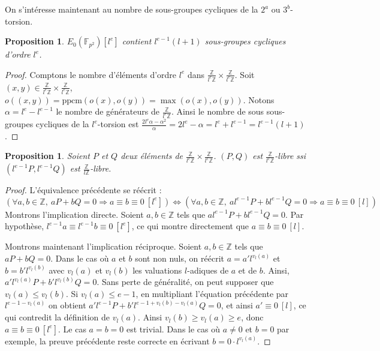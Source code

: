 \documentclass{article}
\theoremstyle{plain}%
\newtheorem{prop}[thm]{Proposition}
\theoremstyle{definition}%
\newcommand{\Fq}{\mathbb{F}_{p^2}}
\newcommand{\Z}{\mathbb{Z}}
\begin{document}
On s'intéresse maintenant au nombre de sous-groupes cycliques de la $2^a$ ou $3^b$-torsion.

\begin{prop}
  $E_0(\Fq)[l^e]$ contient $l^{e-1}(l+1)$ sous-groupes cycliques d'ordre $l^e$.
\end{prop}
\begin{proof}
  Comptons le nombre d'éléments d'ordre $l^e$ dans $\frac{\Z}{l^e\Z} \times \frac{\Z}{l^e\Z}$.
  Soit $\left( x, y \right) \in \frac{\Z}{l^e\Z} \times \frac{\Z}{l^e\Z}$, $o((x, y)) =\textrm{ppcm}(o(x), o(y)) = \max(o(x),o(y))$.
  Notons $\alpha = l^{e} - l^{e-1}$ le nombre de générateurs de $\frac{\Z}{l^e\Z}$. 
  Ainsi le nombre de sous sous-groupes cycliques de la $l^e$-torsion est $\frac{2l^e\alpha -\alpha^2}{\alpha} = 2l^e-\alpha = l^e + l^{e-1} = l^{e-1}(l + 1)$.
\end{proof}

\begin{prop}
  Soient $P$ et $Q$ deux éléments de $\frac{\Z}{l^e\Z} \times \frac{\Z}{l^e\Z}$. 
  $(P, Q)$ est $\frac{\Z}{l^e\Z}$-libre ssi $(l^{e-1}P, l^{e-1}Q)$ est $\frac{\Z}{l\Z}$-libre. 
\end{prop}

\begin{proof}
  L'équivalence précédente se réécrit :
  $$\left( \forall a, b \in \Z,\ aP + bQ = 0 \Rightarrow a \equiv b \equiv 0\ [l^e] \right) \iff \left( \forall a, b \in \Z,\ a l^{e-1}P + b l^{e-1}Q = 0 \Rightarrow a \equiv b \equiv 0\ [l] \right) $$
  Montrons l'implication directe. Soient $a, b\in \Z$ tels que $a l^{e-1}P + b l^{e-1}Q = 0$. 
  Par hypothèse, $l^{e-1}a \equiv l^{e-1}b \equiv 0\ [l^e]$, ce qui montre directement que $a \equiv b \equiv 0\ [l]$. 

  Montrons maintenant l'implication réciproque. Soient $a, b \in \Z$ tels que $aP + bQ = 0$. 
  Dans le cas où $a$ et $b$ sont non nuls, on réécrit $a = a' l^{v_l(a)}$ et $b = b' l^{v_l(b)}$ avec $v_l(a)$ et $v_l(b)$ les valuations $l$-adiques de $a$ et de $b$. 
  Ainsi, $a' l^{v_l(a)}P + b' l^{v_l(b)}Q = 0$. 
  Sans perte de généralité, on peut supposer que $v_l(a) \le v_l(b)$. 
  Si $v_l(a) \le e-1$, en multipliant l'équation précédente par $l^{e-1-v_l(a)}$ on obtient $a' l^{e-1}P + b' l^{e-1 + v_l(b) - v_l(a)}Q = 0$, et ainsi $a' \equiv 0\ [l]$, ce qui contredit la définition de $v_l(a)$. 
  Ainsi $v_l(b) \ge v_l(a) \ge e$, donc $a \equiv b \equiv 0\ [l^e]$. Le cas $a=b=0$ est trivial. Dans le cas où $a\neq0$ et $b=0$ par exemple, la preuve précédente reste correcte en écrivant $b = 0\cdot l^{v_l(a)}$.
\end{proof}
\end{document}
